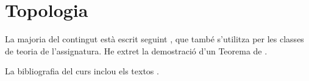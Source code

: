 \documentclass[../../main.tex]{subfiles}
\begin{document}
\part{Topologia}




\printbibliography
La majoria del contingut està escrit seguint \cite{ACTEAguade}, que també s'utilitza per les classes de teoria de l'assignatura.
He extret la demostració d'un Teorema de \cite{SchultzFreeActionsOnFiniteGroupsOnHausdorffSpaces}.

La bibliografia del curs inclou els textos \cite{AFirstCourseInAlgebraicTopologyKosniowski,ABasicCourseInAlgebraicTopologyKosniowski,TopologyKlaus,ACTEAguade}.
\end{document}
